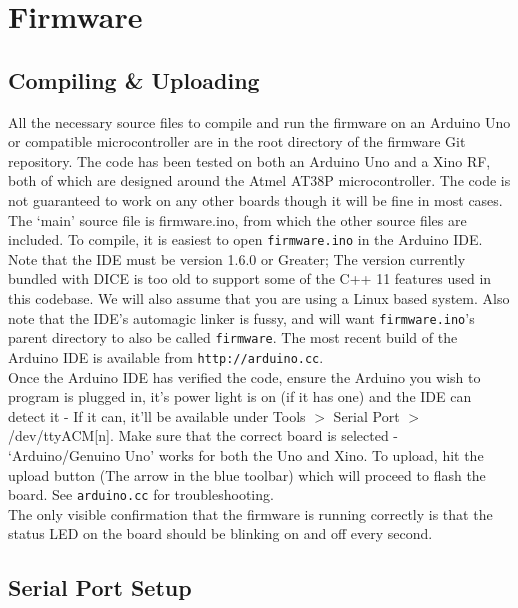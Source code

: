 %
%

\section{Firmware}

\subsection{Compiling \& Uploading}

All the necessary source files to compile and run the firmware on an Arduino Uno or compatible microcontroller are in the root directory of the firmware Git repository. The code has been tested on both an Arduino Uno and a Xino RF, both of which are designed around the Atmel AT38P microcontroller. The code is not guaranteed to work on any other boards though it will be fine in most cases.\\

The `main' source file is firmware.ino, from which the other source files are included. To compile, it is easiest to open \texttt{firmware.ino} in the Arduino IDE. Note that the IDE must be version 1.6.0 or Greater; The version currently bundled with DICE is too old to support some of the C++ 11 features used in this codebase. We will also assume that you are using a Linux based system. Also note that the IDE's automagic linker is fussy, and will want \texttt{firmware.ino}'s parent directory to also be called \texttt{firmware}. The most recent build of the Arduino IDE is available from \texttt{http://arduino.cc}.\\

Once the Arduino IDE has verified the code, ensure the Arduino you wish to program is plugged in, it's power light is on (if it has one) and the IDE can detect it - If it can, it'll be available under Tools $>$ Serial Port $>$ /dev/ttyACM[n]. Make sure that the correct board is selected - `Arduino/Genuino Uno' works for both the Uno and Xino. To upload, hit the upload button (The arrow in the blue toolbar) which will proceed to flash the board. See \texttt{arduino.cc} for troubleshooting.\\

The only visible confirmation that the firmware is running correctly is that the status LED on the board should be blinking on and off every second.

\subsection{Serial Port Setup}

